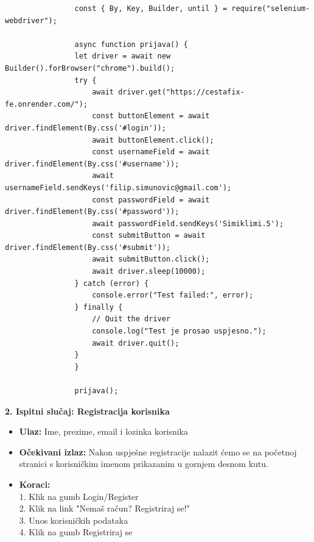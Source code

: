 			\begin{verbatim}
				const { By, Key, Builder, until } = require("selenium-webdriver");

				async function prijava() {
				let driver = await new Builder().forBrowser("chrome").build();
				try {
					await driver.get("https://cestafix-fe.onrender.com/");
					const buttonElement = await driver.findElement(By.css('#login'));
					await buttonElement.click();
					const usernameField = await driver.findElement(By.css('#username'));
					await usernameField.sendKeys('filip.simunovic@gmail.com');
					const passwordField = await driver.findElement(By.css('#password'));
					await passwordField.sendKeys('Simiklimi.5');
					const submitButton = await driver.findElement(By.css('#submit'));
					await submitButton.click();
					await driver.sleep(10000);
				} catch (error) {
					console.error("Test failed:", error);
				} finally {
					// Quit the driver
					console.log("Test je prosao uspjesno.");
					await driver.quit();
				}
				}

				prijava();
			\end{verbatim}

			\textbf{2. Ispitni slučaj: Registracija korisnika}
			 \begin{itemize}
				\item \textbf{Ulaz:} Ime, prezime, email i lozinka korisnika
				\item \textbf{Očekivani izlaz:} Nakon uspješne registracije nalazit ćemo se na početnoj stranici s korisničkim imenom prikazanim u gornjem desnom kutu.
				\item \textbf{Koraci:} 
				\\ 1. Klik na gumb Login/Register
				\\ 2. Klik na link "Nemaš račun? Registriraj se!"
				\\ 3. Unos korisničkih podataka
				\\ 4. Klik na gumb Registriraj se
			\end{itemize}

